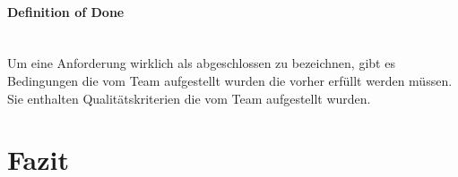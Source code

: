 \documentclass[a4paper, ngerman, 12pt, usenames, dvipsnames]{article}
\begin{document}
    \paragraph{Definition of Done}\mbox{} \\
    Um eine Anforderung wirklich als abgeschlossen zu bezeichnen, gibt es Bedingungen die vom Team aufgestellt wurden die vorher erfüllt werden müssen.
    Sie enthalten Qualitätskriterien die vom Team aufgestellt wurden.

\section{Fazit}



\end{document}
